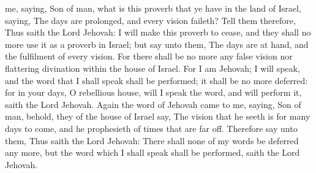 me, saying, Son of man, what is this proverb that ye have in the land of Israel, saying, The days are prolonged, and every vision faileth? Tell them therefore, Thus saith the Lord Jehovah: I will make this proverb to cease, and they shall no more use it as a proverb in Israel; but say unto them, The days are at hand, and the fulfilment of every vision. For there shall be no more any false vision nor flattering divination within the house of Israel. For I am Jehovah; I will speak, and the word that I shall speak shall be performed; it shall be no more deferred: for in your days, O rebellious house, will I speak the word, and will perform it, saith the Lord Jehovah.  Again the word of Jehovah came to me, saying, Son of man, behold, they of the house of Israel say, The vision that he seeth is for many days to come, and he prophesieth of times that are far off. Therefore say unto them, Thus saith the Lord Jehovah: There shall none of my words be deferred any more, but the word which I shall speak shall be performed, saith the Lord Jehovah. 


